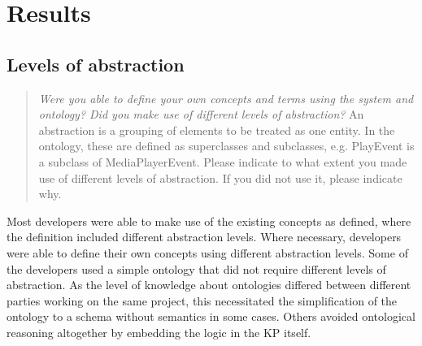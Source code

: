 % 
% 
% 

\section{Results}


\subsection{Levels of abstraction}

\begin{quote}
	\emph{Were you able to define your own concepts and terms using the system and ontology? Did you make use of different levels of abstraction?} An abstraction is a grouping of elements to be treated as one entity. In the ontology, these are defined as superclasses and subclasses, e.g. PlayEvent is a subclass of MediaPlayerEvent. Please indicate to what extent you made use of different levels of abstraction. If you did not use it, please indicate why.
\end{quote}

Most developers were able to make use of the existing concepts as defined, where the definition included different abstraction levels. Where necessary, developers were able to define their own concepts using different abstraction levels. Some of the developers used a simple ontology that did not require different levels of abstraction. As the level of knowledge about ontologies differed between different parties working on the same project, this necessitated the simplification of the ontology to a schema without semantics in some cases. Others avoided ontological reasoning altogether by embedding the logic in the KP itself.



